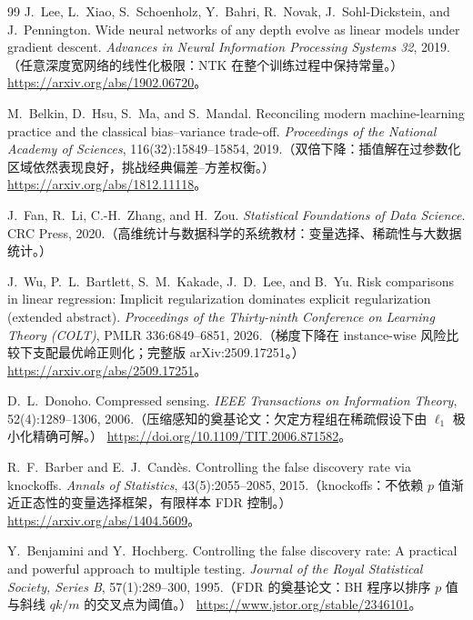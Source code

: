\documentclass[11pt, a4paper]{ctexart}
\theoremstyle{plain}
\theoremstyle{definition}
\theoremstyle{remark}
\begin{document}
\begin{thebibliography}{99}
J.~Lee, L.~Xiao, S.~Schoenholz, Y.~Bahri, R.~Novak, J.~Sohl-Dickstein, and J.~Pennington.
\newblock Wide neural networks of any depth evolve as linear models under gradient descent.
\newblock \emph{Advances in Neural Information Processing Systems 32}, 2019.（任意深度宽网络的线性化极限：NTK 在整个训练过程中保持常量。）
\newblock \url{https://arxiv.org/abs/1902.06720}。

M.~Belkin, D.~Hsu, S.~Ma, and S.~Mandal.
\newblock Reconciling modern machine-learning practice and the classical bias--variance trade-off.
\newblock \emph{Proceedings of the National Academy of Sciences}, 116(32):15849--15854, 2019.（双倍下降：插值解在过参数化区域依然表现良好，挑战经典偏差--方差权衡。）
\newblock \url{https://arxiv.org/abs/1812.11118}。

J.~Fan, R.~Li, C.-H.~Zhang, and H.~Zou.
\newblock \emph{Statistical Foundations of Data Science}.
\newblock CRC Press, 2020.（高维统计与数据科学的系统教材：变量选择、稀疏性与大数据统计。）

J.~Wu, P.~L.~Bartlett, S.~M.~Kakade, J.~D.~Lee, and B.~Yu.
\newblock Risk comparisons in linear regression: Implicit regularization dominates explicit regularization (extended abstract).
\newblock \emph{Proceedings of the Thirty-ninth Conference on Learning Theory (COLT)}, PMLR 336:6849--6851, 2026.（梯度下降在 instance-wise 风险比较下支配最优岭正则化；完整版 arXiv:2509.17251。）
\newblock \url{https://arxiv.org/abs/2509.17251}。

D.~L.~Donoho.
\newblock Compressed sensing.
\newblock \emph{IEEE Transactions on Information Theory}, 52(4):1289--1306, 2006.（压缩感知的奠基论文：欠定方程组在稀疏假设下由 $\ell_1$ 极小化精确可解。）
\newblock \url{https://doi.org/10.1109/TIT.2006.871582}。

R.~F.~Barber and E.~J.~Cand\`es.
\newblock Controlling the false discovery rate via knockoffs.
\newblock \emph{Annals of Statistics}, 43(5):2055--2085, 2015.（knockoffs：不依赖 $p$ 值渐近正态性的变量选择框架，有限样本 FDR 控制。）
\newblock \url{https://arxiv.org/abs/1404.5609}。

Y.~Benjamini and Y.~Hochberg.
\newblock Controlling the false discovery rate: A practical and powerful approach to multiple testing.
\newblock \emph{Journal of the Royal Statistical Society, Series B}, 57(1):289--300, 1995.（FDR 的奠基论文：BH 程序以排序 $p$ 值与斜线 $qk/m$ 的交叉点为阈值。）
\newblock \url{https://www.jstor.org/stable/2346101}。


\end{thebibliography}
\end{document}
